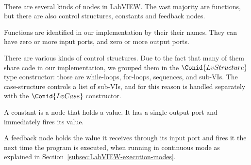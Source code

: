 \begin{hscode}\SaveRestoreHook
{}%
%
%
%
%
%
%
%
%
\>[B]{}\;\<[19]%
\>[19]{}\mathrel{=}{}\<[19E]%
\>[22]{}\;\<[E]%
\\
\>[19]{}\mid {}\<[19E]%
\>[22]{}\;\<[E]%
\\
\>[19]{}\mid {}\<[19E]%
\>[22]{}\;\<[E]%
\\
\>[B]{}\<[4]%
\>[4]{}\;\<[E]%
\\[\blanklineskip]%
\>[B]{}\;\<[20]%
\>[20]{}\mathrel{=}{}\<[20E]%
\>[23]{}\<[E]%
\\
\>[20]{}\mid {}\<[20E]%
\>[23]{}\<[E]%
\\
\>[B]{}\<[4]%
\>[4]{}\;\<[E]%
\ColumnHook
\end{hscode}\resethooks

There are several kinds of nodes in LabVIEW. The vast majority are functions,
but there are also control structures, constants and feedback nodes.

Functions are identified in our implementation by their their names. They can
have zero or more input ports, and zero or more output ports.

There are various kinds of control structures. Due to the fact that many of
them share code in our implementation, we grouped them in the \ensuremath{\Conid{LvStructure}}
type constructor: those are while-loops, for-loops, sequences, and sub-VIs.
The case-structure controls a list of sub-VIs, and for this reason is handled
separately with the \ensuremath{\Conid{LvCase}} constructor.

A constant is a node that holds a value. It has a single output port and
immediately fires its value.

A feedback node holds the value it receives through its input port and fires
it the next time the program is executed, when running in continuous mode
as explained in Section~\ref{subsec:LabVIEW-execution-modes}.

